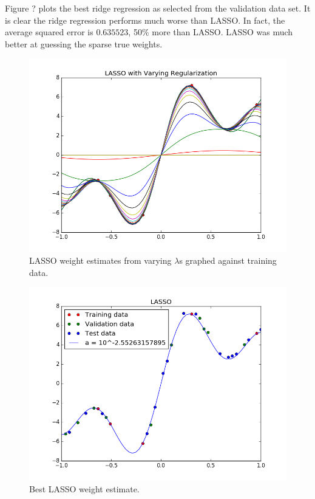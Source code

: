 \documentclass[a4paper,twoside]{article}
\begin{document}
Figure ? plots the best ridge regression as selected from the validation data set. It is clear the ridge regression performs much worse than LASSO. In fact, the average squared error is $0.635523$, 50\% more than LASSO. LASSO was much better at guessing the sparse true weights.




\begin{figure}[b!]
  \includegraphics[width=\linewidth]{../Figures/P4/lasso_varying.png}
  \caption{LASSO weight estimates from varying $\lambda$s graphed against training data.}
  \label{fig:lasso_varying}
\end{figure}

\begin{figure}[b!]
  \includegraphics[width=\linewidth]{../Figures/P4/lasso_best.png}
  \caption{Best LASSO weight estimate.}
  \label{fig:lasso_best}
\end{figure}
\end{document}
